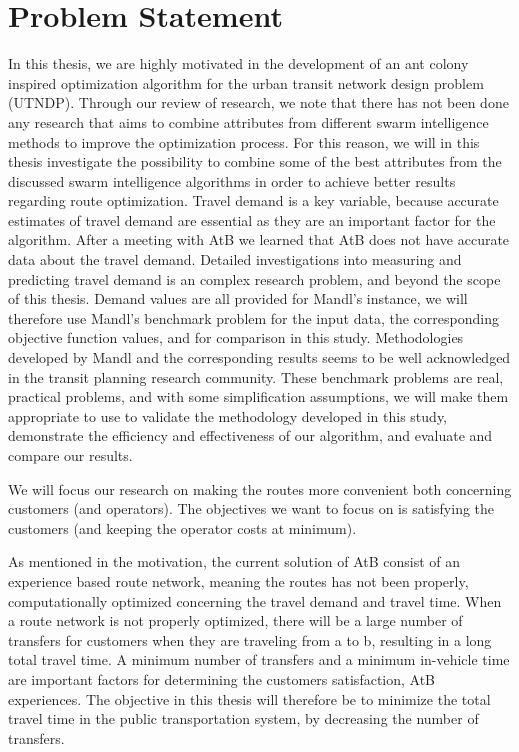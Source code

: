 \section{Problem Statement}
In this thesis, we are highly motivated in the development of an ant colony inspired optimization algorithm for the urban transit network design problem (UTNDP). Through our review of research, we note that there has not been done any research that aims to combine attributes from different swarm intelligence methods to improve the optimization process. For this reason, we will in this thesis investigate the possibility to combine some of the best attributes from the discussed swarm intelligence algorithms in order to achieve better results regarding route optimization. Travel demand is a key variable, because accurate estimates of travel demand are essential as they are an important factor for the algorithm. After a meeting with AtB we learned that AtB does not have accurate data about the travel demand. Detailed investigations into measuring and predicting travel demand is an complex research problem, and beyond the scope of this thesis. Demand values are all provided for Mandl's instance, we will therefore use Mandl's benchmark problem \citep{mandl79} for the input data, the corresponding objective function values, and for comparison in this study. Methodologies developed by Mandl and the corresponding results seems to be well acknowledged in the transit planning research community. These benchmark problems are real, practical problems, and with some simplification assumptions, we will make them appropriate to use to validate the methodology developed in this study, demonstrate the efficiency and effectiveness of our algorithm, and evaluate and compare our results. 

We will focus our research on making the routes more convenient both concerning customers (and operators). The objectives we want to focus on is satisfying the customers (and keeping the operator costs at minimum). 

As mentioned in the motivation, %
the current solution of AtB consist of an experience based route network, meaning the routes has not been properly, computationally optimized concerning the travel demand and travel time. When a route network is not properly optimized, there will be a large number of transfers for customers when they are traveling from a to b, resulting in a long total travel time. A minimum number of transfers and a minimum in-vehicle time are important factors for determining the customers satisfaction, AtB experiences. The objective in this thesis will therefore be to minimize the total travel time in the public transportation system, by decreasing the number of transfers. 

